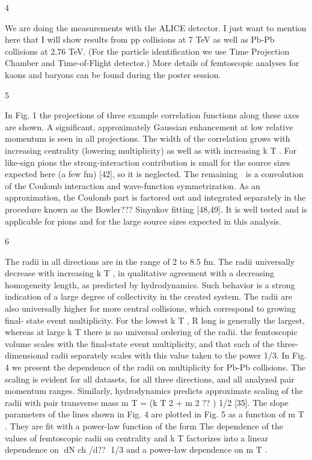 4

We are doing the measurements with the ALICE detector. 
I just want to mention here that I will show results from pp collisions at 7 TeV as well as Pb-Pb collisions at 2.76 TeV. (For the particle identification we use Time Projection Chamber and Time-of-Flight detector.) 
More details of femtoscopic analyses for kaons and baryons can be found during the poster session.

5

In Fig. 1 the projections
of three example correlation functions along these axes are
shown. A significant, approximately Gaussian enhancement
at low relative momentum is seen in all projections. The width
of the correlation grows with increasing centrality (lowering
multiplicity) as well as with increasing k T .
For like-sign pions the strong-interaction contribution is
small for the source sizes expected here (a few fm) [42],
so it is neglected. The remaining  is a convolution of
the Coulomb interaction and wave-function symmetrization.
As an approximation, the Coulomb part is factored out and
integrated separately in the procedure known as the Bowler???
Sinyukov fitting [48,49]. It is well tested and is applicable for
pions and for the large source sizes expected in this analysis.

6

The radii in all directions
are in the range of 2 to 8.5 fm. The radii universally decrease
with increasing k T , in qualitative agreement with a decreasing
homogeneity length, as predicted by hydrodynamics. Such
behavior is a strong indication of a large degree of collectivity
in the created system. The radii are also universally higher for
more central collisions, which correspond to growing final-
state event multiplicity. For the lowest k T , R long is generally
the largest, whereas at large k T there is no universal ordering
of the radii.
the femtoscopic volume
scales with the final-state event multiplicity, and that each of
the three-dimensional radii separately scales with this value
taken to the power 1/3. In Fig. 4 we present the dependence
of the radii on multiplicity for Pb-Pb collisions. The scaling is
evident for all datasets, for all three directions, and all analyzed
pair momentum ranges.
Similarly, hydrodynamics predicts approximate scaling of
the radii with pair transverse mass m T = (k T 2 + m 2 ?? ) 1/2 [35].
The slope parameters of the lines shown in Fig. 4 are plotted
in Fig. 5 as a function of m T . They are fit with a power-law
function of the form
The dependence of
the values of femtoscopic radii on centrality and k T factorizes
into a linear dependence on dN ch /d?? 1/3 and a power-law
dependence on m T .

